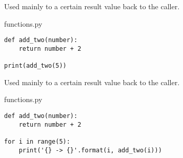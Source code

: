 \documentclass[aspectratio=1610,slidestop]{beamer}
\begin{document}
\begin{pframe}
 Used mainly to  a certain result value back to the caller.
 \medskip

 \begin{minipage}[t]{0.47\textwidth}
  \begin{pythonfile}{functions.py}
   \begin{verbatim}
def add_two(number):
    return number + 2

print(add_two(5))
   \end{verbatim}
  \end{pythonfile}
 \end{minipage}\qquad
 \begin{minipage}[t]{0.47\textwidth}
 \vspace{-2.55cm}
 \begin{terminal}
 \end{terminal}
 \end{minipage}
\end{pframe}


\begin{pframe}
 Used mainly to  a certain result value back to the caller.
 \medskip

 \begin{minipage}[t]{0.60\textwidth}
  \begin{pythonfile}{functions.py}
   \begin{verbatim}
def add_two(number):
    return number + 2

for i in range(5):
    print('{} -> {}'.format(i, add_two(i)))
   \end{verbatim}
  \end{pythonfile}
 \end{minipage}\qquad
 \pause
 \begin{minipage}[t]{0.35\textwidth}
 \vspace{-3.05cm}
 \begin{terminal}
 \end{terminal}
 \end{minipage}
\end{pframe}
\end{document}
